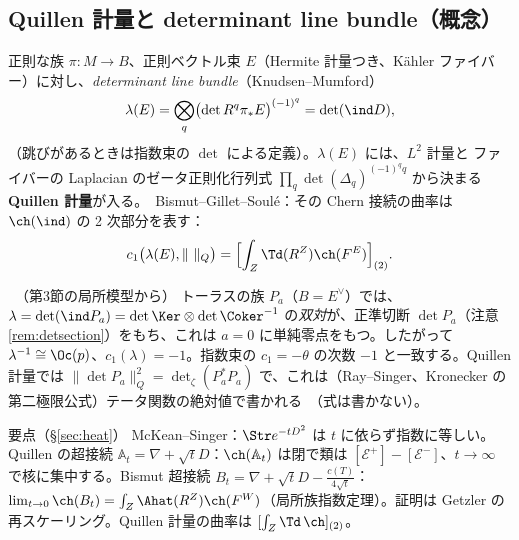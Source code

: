 \subsection{Quillen 計量と determinant line bundle（概念）}
正則な族 $\pi:M\to B$、正則ベクトル束 $E$（Hermite 計量つき、Kähler ファイバー）に対し、\emph{determinant line bundle}（Knudsen--Mumford）
\[
\lambda(E)=\bigotimes_q\bigl(\det R^q\pi_*E\bigr)^{(-1)^q}=\det(\ind D),
\]
（跳びがあるときは指数束の $\det$ による定義）。$\lambda(E)$ には、$L^2$ 計量と ファイバーの Laplacian のゼータ正則化行列式 $\prod_q\det(\Delta_q)^{(-1)^qq}$ から決まる\textbf{Quillen 計量}が入る。\tC\ Bismut--Gillet--Soulé：その Chern 接続の曲率は $\ch(\ind)$ の 2 次部分を表す：
\[
c_1\bigl(\lambda(E),\|\ \|_Q\bigr)=\Bigl[\int_Z\Td(R^Z)\ch(F^E)\Bigr]_{(2)}.
\]
\begin{ex}\label{ex:detline}\tP\ （第3節の局所模型から）
トーラスの族 $P_a$（$B=E^\vee$）では、$\lambda=\det(\ind P_a)=\det\Ker\otimes\det\Coker^{-1}$ の\emph{双対}が、正準切断 $\det P_a$（注意 \ref{rem:detsection}）をもち、これは $a=0$ に単純零点をもつ。したがって $\lambda^{-1}\cong\Oc(p)$、$c_1(\lambda)=-1$。指数束の $c_1=-\theta$ の次数 $-1$ と一致する。Quillen 計量では $\|\det P_a\|^2_Q=\det_\zeta(P_a^*P_a)$ で、これは（Ray--Singer、Kronecker の第二極限公式）テータ関数の絶対値で書かれる\tQ\ （式は書かない）。
\end{ex}

\begin{keybox}{要点（\S\ref{sec:heat}）}
McKean--Singer：$\Str e^{-tD^2}$ は $t$ に依らず指数に等しい。Quillen の超接続 $\mathbb A_t=\nabla+\sqrt tD$：$\ch(\mathbb A_t)$ は閉で類は $[\mathcal E^+]-[\mathcal E^-]$、$t\to\infty$ で核に集中する。Bismut 超接続 $B_t=\nabla+\sqrt tD-\frac{c(T)}{4\sqrt t}$：$\lim_{t\to0}\ch(B_t)=\int_Z\Ahat(R^Z)\ch(F^W)$（局所族指数定理）。証明は Getzler の再スケーリング。Quillen 計量の曲率は $[\int_Z\Td\,\ch]_{(2)}$。
\end{keybox}

